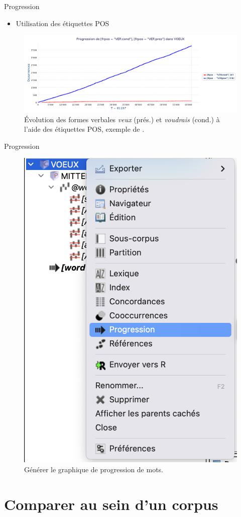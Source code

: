 \documentclass[xetex,xcolor={table,usenames,dvipsnames}]{beamer}
\begin{document}
\begin{frame}{Progression}
	\begin{itemize}
		\item Utilisation des étiquettes \textsc{POS}
	\end{itemize}
	\begin{figure}[h] %
		\centering
		\includegraphics[width=1\linewidth]{img/ver_cond_pres.png}
		\caption{Évolution des formes verbales \textit{veux} (prés.) et \textit{voudrais} (cond.) à l'aide des étiquettes \textsc{POS}, exemple de \textcite{lejeune2023}.}
		\label{fig:ling_out_TAL}
	\end{figure}
\end{frame}

\begin{frame}{Progression}
	\begin{figure}[h] %
		\centering
		\includegraphics[width=.4\linewidth]{img/generer_progression.png}
		\caption{Générer le graphique de progression de mots.}
		\label{fig:ling_out_TAL}
	\end{figure}
\end{frame}

\section{Comparer au sein d'un corpus}
\end{document}
